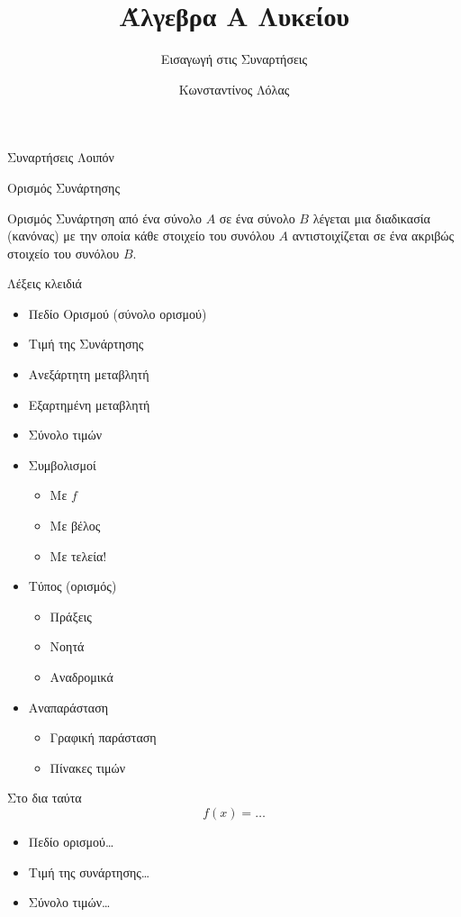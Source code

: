 \documentclass{../../presentation}
\title{Άλγεβρα Α Λυκείου}
\subtitle{Εισαγωγή στις Συναρτήσεις}
\author[Λόλας]{Κωνσταντίνος Λόλας}
\date{}
\begin{document}
\frame{\titlepage}

\begin{frame}{Συναρτήσεις Λοιπόν}

\end{frame}

\begin{frame}{Ορισμός Συνάρτησης}

  \begin{block}{Ορισμός}
    Συνάρτηση από ένα σύνολο $Α$ σε ένα σύνολο $Β$ λέγεται μια διαδικασία (κανόνας) με την οποία κάθε στοιχείο του συνόλου $Α$ αντιστοιχίζεται σε ένα ακριβώς στοιχείο του συνόλου $Β$.
  \end{block}
\end{frame}

\begin{frame}
  Λέξεις κλειδιά
  \begin{itemize}[<+->]
    \item Πεδίο Ορισμού (σύνολο ορισμού)
    \item Τιμή της Συνάρτησης
    \item Ανεξάρτητη μεταβλητή
    \item Εξαρτημένη μεταβλητή
    \item Σύνολο τιμών
    \item Συμβολισμοί
          \begin{itemize}[<+->]
            \item Με $f$
            \item Με βέλος
            \item Με τελεία!
          \end{itemize}
    \item Τύπος (ορισμός)
          \begin{itemize}[<+->]
            \item Πράξεις
            \item Νοητά
            \item Αναδρομικά
          \end{itemize}
    \item Αναπαράσταση
          \begin{itemize}[<+->]
            \item Γραφική παράσταση
            \item Πίνακες τιμών
          \end{itemize}
  \end{itemize}
\end{frame}

\begin{frame}{Στο δια ταύτα}
  $$f(x)=\dots$$
  \begin{itemize}
    \item Πεδίο ορισμού\dots
    \item Τιμή της συνάρτησης\dots
    \item Σύνολο τιμών\dots
  \end{itemize}
\end{frame}
\end{document}
